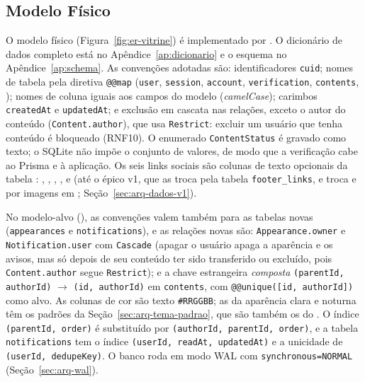 
\subsection{Modelo Físico}

O modelo físico (Figura~\ref{fig:er-vitrine}) é implementado por . O dicionário de dados completo está no Apêndice~\ref{ap:dicionario} e o esquema no Apêndice~\ref{ap:schema}. As convenções adotadas são: identificadores \texttt{cuid}; nomes de tabela pela diretiva \texttt{@@map} (\texttt{user}, \texttt{session}, \texttt{account}, \texttt{verification}, \texttt{contents}, ); nomes de coluna iguais aos campos do modelo (\emph{camelCase}); carimbos \texttt{createdAt} e \texttt{updatedAt}; e exclusão em cascata nas relações, exceto o autor do conteúdo (\texttt{Content.author}), que usa \texttt{Restrict}: excluir um usuário que tenha conteúdo é bloqueado (RNF10). O enumerado \texttt{ContentStatus} é gravado como texto; o SQLite não impõe o conjunto de valores, de modo que a verificação cabe ao Prisma e à aplicação. Os seis links sociais são colunas de texto opcionais da tabela : , , , ,  e  (até o épico v1, que as troca pela tabela \texttt{footer\_links}, e troca  e  por imagens em ; Seção~\ref{sec:arq-dados-v1}).

No modelo-alvo (), as convenções valem também para as tabelas novas (\texttt{appearances} e \texttt{notifications}), e as relações novas são: \texttt{Appearance.owner} e \texttt{Notification.user} com \texttt{Cascade} (apagar o usuário apaga a aparência e os avisos, mas só depois de seu conteúdo ter sido transferido ou excluído, pois \texttt{Content.author} segue \texttt{Restrict}); e a chave estrangeira \emph{composta} \texttt{(parentId, authorId)} $\rightarrow$ \texttt{(id, authorId)} em \texttt{contents}, com \texttt{@@unique([id, authorId])} como alvo. As colunas de cor são texto \texttt{\#RRGGBB}; as da aparência clara e noturna têm os padrões da Seção~\ref{sec:arq-tema-padrao}, que são também os do . O índice \texttt{(parentId, order)} é substituído por \texttt{(authorId, parentId, order)}, e a tabela \texttt{notifications} tem o índice \texttt{(userId, readAt, updatedAt)} e a unicidade de \texttt{(userId, dedupeKey)}. O banco roda em modo WAL com \texttt{synchronous=NORMAL} (Seção~\ref{sec:arq-wal}).

